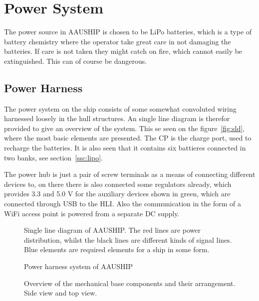 \section{Power System}

The power source in AAUSHIP is chosen to be LiPo batteries, which is
a type of battery chemistry where the operator take great care in not damaging
the batteries. If care is not taken they might catch on fire, which
cannot easily be extinguished. This can of course be dangerous.

\subsection{Power Harness}
The power system on the ship consists of some somewhat convoluted
wiring harnessed loosely in the hull structures. An single line
diagram is therefor provided to give an overview of the system. This
se seen on the figure~\vref{fig:sld}, where the most basic elements
are presented. The CP is the charge port, used to recharge the
batteries. It is also seen that it contains six battieres connected in
two banks, see section~\vref{ssc:lipo}.

The power hub is just a pair of screw terminals as a means of
connecting different devices to, on there there is also connected some
regulators already, which provides 3.3 and 5.0 V for the auxiliary
devices shown in green, which are connected through USB to the
\ac{HLI}. Also the communication in the form of a WiFi access point is
powered from a separate DC supply.

\begin{figure}[htbp]
	
	\caption{Single line diagram of AAUSHIP. The red lines are power
	distribution, whilst the black lines are different kinds of signal
lines. Blue elements are required elements for a ship in some form.}
	\label{fig:sld}
\end{figure}


\begin{figure}[htbp]
	
	\caption{Power harness system of AAUSHIP}
	\label{fig:harness}
\end{figure}

\begin{figure}[htbp]
	
	\caption{Overview of the mechanical base components and their
	arrangement. Side view and top view.}
	\label{fig:mechanical}
\end{figure}


